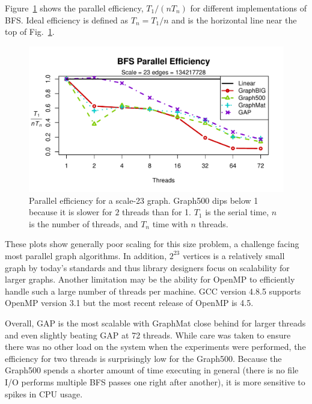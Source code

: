 \documentclass[conference]{IEEEtran}
\begin{document}
Figure~\ref{fig:bfs-efficiency} shows the parallel efficiency,  $T_1 / (nT_n)$ for different implementations of BFS. Ideal efficiency is defined as $T_n = T_1/n$ and is the horizontal line near the top of Fig.~\ref{fig:bfs-efficiency}. 
\begin{figure}[htb]
	\centering
		\includegraphics[width=\linewidth, trim=0 18pt 18pt 12pt, clip]{graphics/bfs_ss23.pdf}
	\caption{Parallel efficiency for a scale-23 graph. Graph500 dips below 1 because it is slower for $2$ threads than for 1. $T_1$ is the serial time, $n$ is the number of threads, and $T_n$ time with $n$ threads.}
	\label{fig:bfs-efficiency}
\end{figure}

These plots show generally poor scaling for this size problem, a challenge facing most parallel graph algorithms. In addition, $2^{23}$ vertices is a relatively small graph by today's standards and thus library designers focus on scalability for larger graphs. Another limitation may be the ability for OpenMP to efficiently handle such a large number of threads per machine. GCC version 4.8.5 supports OpenMP version 3.1 but the most recent release of OpenMP is 4.5.

Overall, GAP is the most scalable with GraphMat close behind for larger threads and even slightly beating GAP at 72 threads. While care was taken to ensure there was no other load on the system when the experiments were performed, the efficiency for two threads is surprisingly low for the Graph500. Because the Graph500 spends a shorter amount of time executing in general (there is no file I/O performs multiple BFS passes one right after another), it is more sensitive to spikes in CPU usage.
\end{document}
